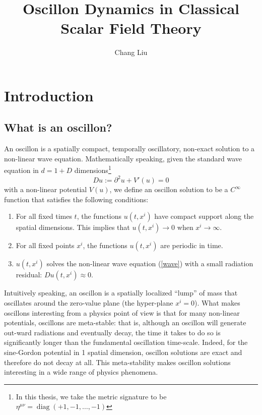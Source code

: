 \documentclass{report}
\DeclareMathOperator{\diag}{diag}
\begin{document}
\title{Oscillon Dynamics in Classical Scalar Field Theory}
\author{Chang Liu}
\maketitle

\tableofcontents

\chapter{Introduction}
\section{What is an oscillon?}
An oscillon is a spatially compact, temporally oscillatory, non-exact solution to a non-linear wave equation. Mathematically speaking, given the standard wave equation in $d=1+D$ dimensions\footnote{In this thesis, we take the metric signature to be $\eta^{\mu\nu} = \diag(+1,-1,\ldots,-1)$}
\begin{equation}\label{wave}
  Du := \partial^2 u + V'(u) = 0
\end{equation}
with a non-linear potential $V(u)$, we define an oscillon solution to be a $C^\infty$ function that satisfies the following conditions:
\begin{enumerate}
\item For all fixed times $t$, the functions $u(t, x^i)$ have compact support along the spatial dimensions. This implies that $u(t,x^i)\to0$ when $x^i \to \infty$.
\item For all fixed points $x^i$, the functions $u(t, x^i)$ are periodic in time.
\item $u(t,x^i)$ solves the non-linear wave equation (\ref{wave}) with a small radiation residual: $Du(t,x^i) \approx 0$.
\end{enumerate}

Intuitively speaking, an oscillon is a spatially localized ``lump'' of mass that oscillates around the zero-value plane (the hyper-plane $x^i=0$). What makes oscillons interesting from a physics point of view is that for many non-linear potentials, oscillons are meta-stable: that is, although an oscillon will generate out-ward radiations and eventually decay, the time it takes to do so is significantly longer than the fundamental oscillation time-scale. Indeed, for the sine-Gordon potential in 1 spatial dimension, oscillon solutions are exact and therefore do not decay at all. This meta-stability makes oscillon solutions interesting in a wide range of physics phenomena.
\end{document}
